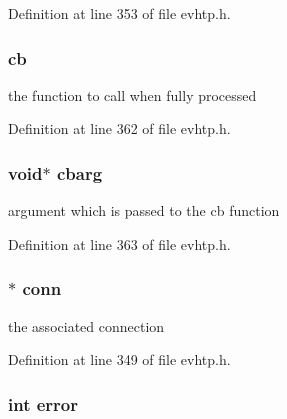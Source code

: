 Definition at line 353 of file evhtp.h.

\hypertarget{structevhtp__request__s_a783ee29046d4ff3e8c75f811e80fd57b}{
\subsubsection[{cb}]{ {\bf cb}}}
\label{structevhtp__request__s_a783ee29046d4ff3e8c75f811e80fd57b}
the function to call when fully processed 

Definition at line 362 of file evhtp.h.

\hypertarget{structevhtp__request__s_aafd3d1a6343925cb274875556a6faa0e}{
\subsubsection[{cbarg}]{\setlength{\rightskip}{0pt plus 5cm}void$\ast$ {\bf cbarg}}}
\label{structevhtp__request__s_aafd3d1a6343925cb274875556a6faa0e}
argument which is passed to the cb function 

Definition at line 363 of file evhtp.h.

\hypertarget{structevhtp__request__s_a313e4d80c47517f02f2fe99e8840c280}{
\subsubsection[{conn}]{$\ast$ {\bf conn}}}
\label{structevhtp__request__s_a313e4d80c47517f02f2fe99e8840c280}
the associated connection 

Definition at line 349 of file evhtp.h.

\hypertarget{structevhtp__request__s_a11614f44ef4d939bdd984953346a7572}{
\subsubsection[{error}]{\setlength{\rightskip}{0pt plus 5cm}int {\bf error}}}
\label{structevhtp__request__s_a11614f44ef4d939bdd984953346a7572}


